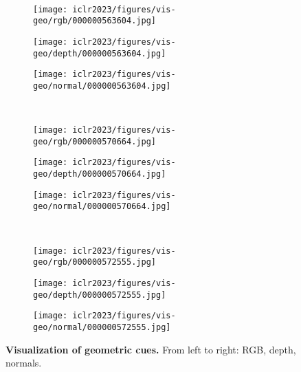 \documentclass{article} \usepackage{iclr2023_conference,times}
\begin{document}
\begin{figure}
\begin{subfigure}[b]{0.32\textwidth}
\label{fig:five over x}
     \end{subfigure}
     \\
      \begin{subfigure}[b]{0.32\textwidth}
         \centering
         \texttt{[image: iclr2023/figures/vis-geo/rgb/000000563604.jpg]}
\label{fig:y equals x}
     \end{subfigure}
     \hfill
     \begin{subfigure}[b]{0.32\textwidth}
         \centering
         \texttt{[image: iclr2023/figures/vis-geo/depth/000000563604.jpg]}
\label{fig:three sin x}
     \end{subfigure}
     \hfill
     \begin{subfigure}[b]{0.32\textwidth}
         \centering
         \texttt{[image: iclr2023/figures/vis-geo/normal/000000563604.jpg]}
\label{fig:five over x}
     \end{subfigure}
     \\
      \begin{subfigure}[b]{0.32\textwidth}
         \centering
         \texttt{[image: iclr2023/figures/vis-geo/rgb/000000570664.jpg]}
\label{fig:y equals x}
     \end{subfigure}
     \hfill
     \begin{subfigure}[b]{0.32\textwidth}
         \centering
         \texttt{[image: iclr2023/figures/vis-geo/depth/000000570664.jpg]}
\label{fig:three sin x}
     \end{subfigure}
     \hfill
     \begin{subfigure}[b]{0.32\textwidth}
         \centering
         \texttt{[image: iclr2023/figures/vis-geo/normal/000000570664.jpg]}
\label{fig:five over x}
     \end{subfigure}
     \\
      \begin{subfigure}[b]{0.32\textwidth}
         \centering
         \texttt{[image: iclr2023/figures/vis-geo/rgb/000000572555.jpg]}
\label{fig:y equals x}
     \end{subfigure}
     \hfill
     \begin{subfigure}[b]{0.32\textwidth}
         \centering
         \texttt{[image: iclr2023/figures/vis-geo/depth/000000572555.jpg]}
\label{fig:three sin x}
     \end{subfigure}
     \hfill
     \begin{subfigure}[b]{0.32\textwidth}
         \centering
         \texttt{[image: iclr2023/figures/vis-geo/normal/000000572555.jpg]}
\label{fig:five over x}
     \end{subfigure}
        \caption{\textbf{Visualization of geometric cues.} From left to right: RGB, depth, normals.}
        \label{fig:geo-vis2}
\end{figure}
\end{document}
